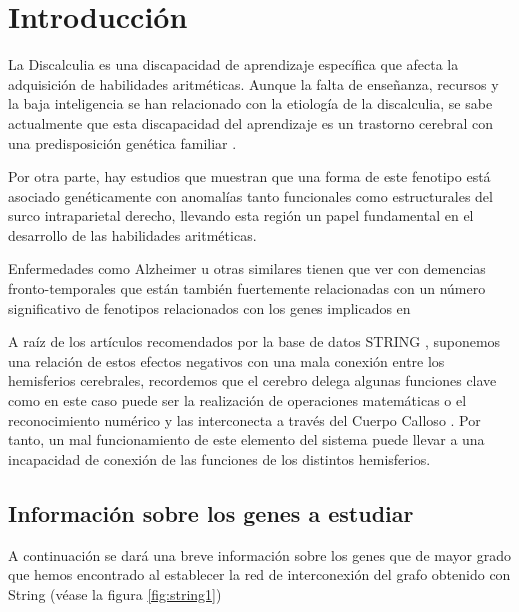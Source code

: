 \section{Introducción}

La Discalculia es una discapacidad de aprendizaje específica que afecta la adquisición de habilidades aritméticas. Aunque la falta de  enseñanza, recursos y la baja inteligencia se han relacionado con la etiología de la discalculia, se sabe actualmente que esta discapacidad del aprendizaje es un trastorno cerebral con una predisposición genética familiar \cite{Molko2003}.

\hfill

Por otra parte, hay estudios \cite{Molko2003,Shalev2001} que muestran que una forma de este fenotipo está asociado genéticamente con anomalías tanto funcionales como estructurales del surco intraparietal derecho, llevando esta región un papel fundamental en el desarrollo de las habilidades aritméticas.

\hfill

Enfermedades como Alzheimer u otras similares tienen que ver con demencias fronto-temporales \cite{Walterfang2014} que están también fuertemente relacionadas con un número significativo de fenotipos relacionados con los genes implicados en 

\hfill


A raíz de los artículos recomendados por la base de datos STRING \cite{Walterfang2014,frontotemporal}, suponemos una relación de estos efectos negativos con una mala conexión entre los hemisferios cerebrales, recordemos que el cerebro delega algunas funciones clave como en este caso puede ser la realización de operaciones matemáticas o el reconocimiento numérico y las interconecta a través del Cuerpo Calloso \cite{CorpusCallosum}. Por tanto, un mal funcionamiento de este elemento del sistema puede llevar a una incapacidad de conexión de las funciones de los distintos hemisferios.

\hfill

\subsection{Información sobre los genes a estudiar}


A continuación se dará una breve información sobre los genes que de mayor grado que hemos encontrado al establecer la red de interconexión del grafo obtenido con String (véase la figura \ref{fig:string1})

\hfill

